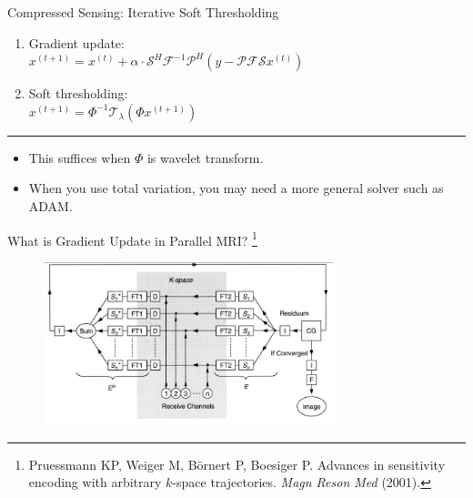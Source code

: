 \begin{frame}{Compressed Sensing: Iterative Soft Thresholding}
	\begin{enumerate}
		\item Gradient update:\\
		\hspace{4em} $x^{(t+1)} = x^{(t)} + \alpha \cdot \mathcal{S}^H \mathcal{F}^{-1} \mathcal{P}^{H} (y - \mathcal{P} \mathcal{F} \mathcal{S} x^{(t)})$
		\vspace{2em}
		\item Soft thresholding:\\
		\hspace{4em} $x^{(t+1)} = \Phi^{-1}\mathcal{T}_\lambda(\Phi x^{(t+1)})$
	\end{enumerate}

	\vspace{1em}
	\hrule
	\vspace{1em}
	
	\begin{itemize}
		\item This suffices when $\Phi$ is wavelet transform. 
		\item When you use total variation, you may need a more general solver such as ADAM.
	\end{itemize}

\end{frame}


\begin{frame}{What is Gradient Update in Parallel MRI? \footnote{Pruessmann KP, Weiger M, B\"ornert P, Boesiger P. Advances in sensitivity encoding with arbitrary $k$-space trajectories. \textit{Magn Reson Med} (2001).}}
	\begin{figure}
		\centering
		\includegraphics[width=0.75\textwidth]{fig/cgsense.png}
	\end{figure}
\end{frame}


